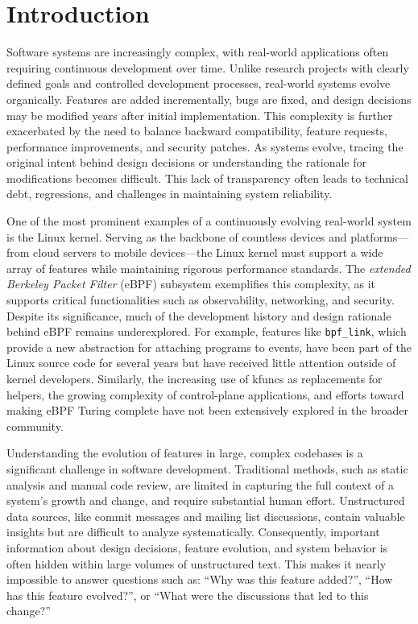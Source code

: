 \documentclass[sigconf,review,anonymous]{acmart}
\begin{document}
\maketitle

\section{Introduction}

Software systems are increasingly complex, with real-world applications often requiring continuous development over time. Unlike research projects with clearly defined goals and controlled development processes, real-world systems evolve organically. Features are added incrementally, bugs are fixed, and design decisions may be modified years after initial implementation. This complexity is further exacerbated by the need to balance backward compatibility, feature requests, performance improvements, and security patches. As systems evolve, tracing the original intent behind design decisions or understanding the rationale for modifications becomes difficult. This lack of transparency often leads to technical debt, regressions, and challenges in maintaining system reliability.

One of the most prominent examples of a continuously evolving real-world system is the Linux kernel. Serving as the backbone of countless devices and platforms—from cloud servers to mobile devices—the Linux kernel must support a wide array of features while maintaining rigorous performance standards. The \textit{extended Berkeley Packet Filter} (eBPF)\cite{ebpf} subsystem exemplifies this complexity, as it supports critical functionalities such as observability\cite{shen2023network}, networking\cite{vieira2020fast}, and security\cite{deri2019combining}. Despite its significance, much of the development history and design rationale behind eBPF remains underexplored. For example, features like \texttt{bpf\_link}\cite{bpflink}, which provide a new abstraction for attaching programs to events, have been part of the Linux source code for several years but have received little attention outside of kernel developers. Similarly, the increasing use of kfuncs \cite{kfuncs} as replacements for helpers, the growing complexity of control-plane applications, and efforts toward making eBPF Turing complete have not been extensively explored in the broader community.

Understanding the evolution of features in large, complex codebases is a significant challenge in software development\cite{godfrey2008past,mens2008introduction}. Traditional methods, such as static analysis and manual code review, are limited in capturing the full context of a system's growth and change, and require substantial human effort. Unstructured data sources, like commit messages and mailing list discussions, contain valuable insights but are difficult to analyze systematically. Consequently, important information about design decisions, feature evolution, and system behavior is often hidden within large volumes of unstructured text. This makes it nearly impossible to answer questions such as: ``Why was this feature added?'', ``How has this feature evolved?'', or ``What were the discussions that led to this change?''
\end{document}
